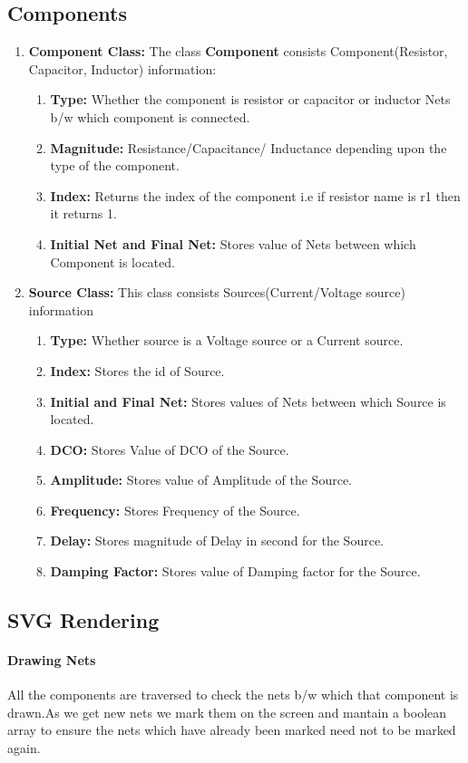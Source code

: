 \documentclass[12pt]{extarticle}
\begin{document}
\subsection{Components}
\begin{enumerate}
\item \textbf{Component Class:}
The class \textbf{Component} consists 
Component(Resistor, Capacitor, Inductor) information:
\begin{enumerate}
\item \textbf{Type:} Whether the component is resistor or capacitor or inductor
Nets b/w which component is connected.
\item \textbf{Magnitude: } Resistance/Capacitance/ Inductance depending upon the 
type of the component.
\item \textbf{Index:} Returns the index of the component i.e if resistor name is r1 then it returns 1.
\item \textbf{Initial Net and Final Net: } Stores value of Nets between which Component is located. 
\end{enumerate} 
\item \textbf{Source Class:}
This class consists Sources(Current/Voltage source) information
\begin{enumerate}
\item \textbf{Type: }Whether source is a Voltage source or a Current source.
\item \textbf{Index: }Stores the id of Source.
\item \textbf{Initial and Final Net: }Stores values of Nets between which Source is located.
\item \textbf{DCO: }Stores Value of DCO of the Source.
\item \textbf{Amplitude: }Stores value of Amplitude of the Source.
\item \textbf{Frequency: }Stores Frequency of the Source.
\item \textbf{Delay: }Stores magnitude of Delay in second for the Source.
\item \textbf{Damping Factor: }Stores value of Damping factor for the Source.
\end{enumerate}

\end{enumerate}

\subsection{SVG Rendering}
\paragraph{Drawing Nets}
All the components are traversed to check the nets b/w which that component is drawn.As we get new nets we mark them on the screen and mantain a boolean array to ensure the nets which have already been marked need not to be marked again.  
\end{document}
